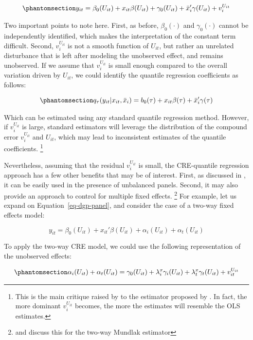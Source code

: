 \documentclass[bib]{statapress}
\begin{document}
\begin{equation}\phantomsection\label{eq-cre-dgp}{y_{it} = \beta_0(U_{it}) + x_{it}\beta(U_{it}) + \gamma_0(U_{it}) + \bar x_i'\gamma(U_{it}) + v^{U_{it}}_i 
}\end{equation}

Two important points to note here. First, as before, \(\beta_0(\cdot)\)
and \(\gamma_0(\cdot)\) cannot be independently identified, which makes
the interpretation of the constant term difficult. Second,
\(v^{U_{it}}_i\) is not a smooth function of \(U_{it}\), but rather an
unrelated disturbance that is left after modeling the unobserved effect,
and remains unobserved. If we assume that \(v^{U_{it}}_i\) is small
enough compared to the overall variation driven by \(U_{it}\), we could
identify the quantile regression coefficients as follows:

\begin{equation}\phantomsection\label{eq-cre-1way}{q_\tau(y_{it}|x_{it},\bar x_i)=b_0(\tau) + x_{it}\beta(\tau)+\bar x_i'\gamma(\tau)
}\end{equation}

Which can be estimated using any standard quantile regression method.
However, if \(v^{U_{it}}_i\) is large, standard estimators will leverage
the distribution of the compound error \(v^{U_{it}}_i\) and \(U_{it}\),
which may lead to inconsistent estimates of the quantile coefficients.
\footnote{This is the main critique raised by \citet{canay2011} to the
  estimator proposed by \citet{abrevaya2008}. In fact, the more dominant
  \(v^{U_{it}}_i\) becomes, the more the estimates will resemble the OLS
  estimates.}

Nevertheless, assuming that the residual \(v^{U_{it}}_i\) is small, the
CRE-quantile regression approach has a few other benefits that may be of
interest. First, as discussed in \citet{wooldridge2019}, it can be
easily used in the presence of unbalanced panels. Second, it may also
provide an approach to control for multiple fixed effects. \footnote{\citet{baltagi2023}
  and \citet{wooldridge2021} discuss this for the two-way Mundlak
  estimator} For example, let us expand on Equation~\ref{eq-dgp-panel},
and consider the case of a two-way fixed effects model:

\[y_{it} = \beta_0(U_{it}) + x_{it}'\beta(U_{it}) + \alpha_i(U_{it}) + \alpha_t(U_{it})
\]

To apply the two-way CRE model, we could use the following
representation of the unobserved effects:

\begin{equation}\phantomsection\label{eq-cre-unobs}{\alpha_i(U_{it}) + \alpha_t(U_{it}) = \gamma_0(U_{it}) + \lambda_i^x \gamma_i(U_{it}) + \lambda_t^x \gamma_t(U_{it}) + v^{U_{it}}_{it}
}\end{equation}
\end{document}
